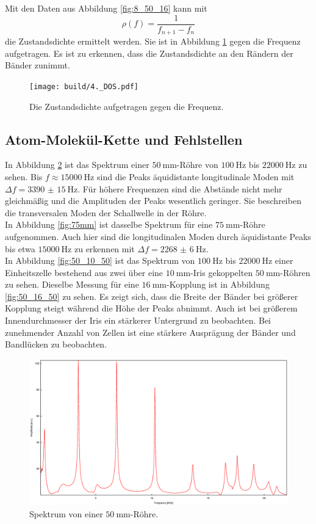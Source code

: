 \newpage
\noindent Mit den Daten aus Abbildung \ref{fig:8_50_16} kann mit
\[
\rho(f) = \frac{1}{f_{n+1}-f_n}
\]
die Zustandsdichte ermittelt werden. Sie ist in Abbildung \ref{fig:DOS} gegen die Frequenz aufgetragen. Es ist zu erkennen, dass die Zustandsdichte an den Rändern der Bänder zunimmt.

\begin{figure}
\centering
\texttt{[image: build/4.\_DOS.pdf]}
\caption{Die Zustandsdichte aufgetragen gegen die Frequenz.}
\label{fig:DOS}
\end{figure}

\subsection{Atom-Molekül-Kette und Fehlstellen}

In Abbildung \ref{fig:50mm} ist das Spektrum einer $\SI{50}{\milli\meter}$-Röhre von $\SI{100}{\hertz}$ bis $\SI{22000}{\hertz}$ zu sehen. Bis $f\approx\SI{15000}{\hertz}$
sind die Peaks äquidistante longitudinale Moden mit $\Delta f=\SI{3390(15)}{\hertz}$. Für höhere Frequenzen sind die Abstände nicht mehr gleichmäßig und die Amplituden der Peaks wesentlich geringer. Sie beschreiben die transversalen Moden der Schallwelle in der Röhre.\\
In Abbildung \ref{fig:75mm} ist dasselbe Spektrum für eine $\SI{75}{\milli\meter}$-Röhre aufgenommen. Auch hier sind die longitudinalen Moden durch äquidistante Peaks bis etwa $\SI{15000}{\hertz}$ zu erkennen mit $\Delta f=\SI{2268(6)}{\hertz}$.\\
In Abbildung \ref{fig:50_10_50} ist das Spektrum von $\SI{100}{\hertz}$ bis $\SI{22000}{\hertz}$ einer Einheitszelle bestehend aus zwei über eine $\SI{10}{\milli\meter}$-Iris gekoppelten $\SI{50}{\milli\meter}$-Röhren zu sehen. Dieselbe Messung für eine $\SI{16}{\milli\meter}$-Kopplung ist in Abbildung \ref{fig:50_16_50} zu sehen. Es zeigt sich, dass die Breite der Bänder bei größerer Kopplung steigt während die Höhe der Peaks abnimmt. Auch ist bei größerem Innendurchmesser der Iris ein stärkerer Untergrund zu beobachten.
Bei zunehmender Anzahl von Zellen ist eine stärkere Ausprägung der Bänder und Bandlücken zu beobachten.

\begin{figure}
\centering
\includegraphics[width=\linewidth-60pt,height=\textheight-60pt,keepaspectratio]{FP-V23data/4.6_50mm.eps}
\caption{Spektrum von einer $\SI{50}{\milli\meter}$-Röhre.}
\label{fig:50mm}
\end{figure}

